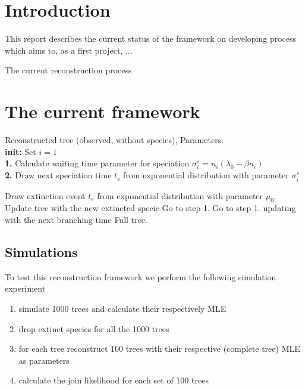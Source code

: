 \documentclass[10pt,a4paper]{article}
\begin{document}
\section*{Introduction}

This report describes the current status of the framework on developing process which aims to, as a first project, ...

The current reconstruction process 

\section{The current framework}

\begin{algorithmic}
 Reconstructed tree (observed, without species), Parameters. \\
{\bf init:} Set $i=1$ \\
{\bf 1.} Calculate waiting time parameter for speciation $\sigma_i^s = n_i(\lambda_0-\beta n_i)$  \\
{\bf 2.} Draw next speciation time $t_s$ from exponential distribution with parameter $\sigma_i^s$ 

         Draw extinction event $t_e$ from exponential distribution with parameter $\mu_0$.
        	 Update tree with the new extincted specie
        \ELSE
        	 Go to step 1.
        \ENDIF
    \ELSE
    	 Go to step 1. updating with the next branching time
    \ENDIF
{} Full tree.
\end{algorithmic}


\subsection*{Simulations}

To test this reconstruction framework we perform the following simulation experiment

\begin{enumerate}

\item simulate 1000 trees and calculate their respectively MLE
\item drop extinct species for all the 1000 trees
\item for each tree reconstruct 100 trees with their respective (complete tree) MLE as parameters
\item calculate the join likelihood for each set of 100 trees

\end{enumerate}
\end{document}
